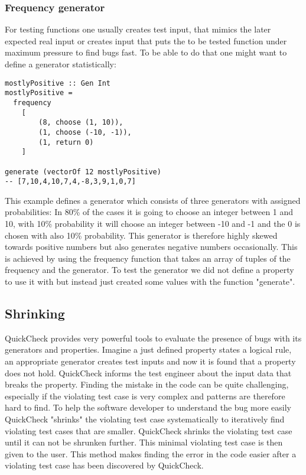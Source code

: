 \documentclass[a4paper, 12pt]{article} %
\begin{document}
\subsubsection{Frequency generator}

For testing functions one usually creates test input, that mimics the later expected real input or creates input that puts the to be tested function under maximum pressure to find bugs fast. To be able to do that one might want to define a generator statistically:

\begin{verbatim}
mostlyPositive :: Gen Int
mostlyPositive =
  frequency
    [ 
        (8, choose (1, 10)),
        (1, choose (-10, -1)),
        (1, return 0)
    ]

generate (vectorOf 12 mostlyPositive) 
-- [7,10,4,10,7,4,-8,3,9,1,0,7]
\end{verbatim}

This example defines a generator which consists of three generators with assigned probabilities: In 80\% of the cases it is going to choose an integer between 1 and 10, with 10\% probability it will choose an integer between -10 and -1 and the 0 is chosen with also 10\% probability. This generator is therefore highly skewed towards positive numbers but also generates negative numbers occasionally. This is achieved by using the frequency function that takes an array of tuples of the frequency and the generator. To test the generator we did not define a property to use it with but instead just created some values with the function "generate".

\subsection{Shrinking}

QuickCheck provides very powerful tools to evaluate the presence of bugs with its generators and properties. Imagine a just defined property states a logical rule, an appropriate generator creates test inputs and now it is found that a property does not hold. QuickCheck informs the test engineer about the input data that breaks the property. Finding the mistake in the code can be quite challenging, especially if the violating test case is very complex and patterns are therefore hard to find. To help the software developer to understand the bug more easily QuickCheck "shrinks" the violating test case systematically to iteratively find violating test cases that are smaller. QuickCheck shrinks the violating test case until it can not be shrunken further. This minimal violating test case is then given to the user. This method makes finding the error in the code easier after a violating test case has been discovered by QuickCheck. \cite{Claessen2009}
\end{document}
